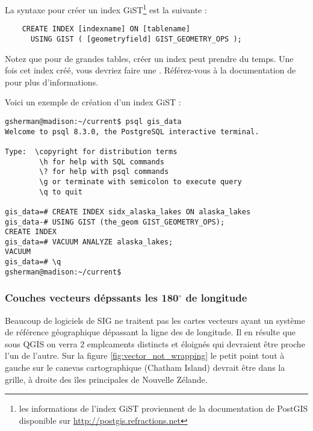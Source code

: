 La syntaxe pour créer un index GiST\footnote{les informations de l'index GiST proviennent de la documentation de PostGIS disponible sur \url{http://postgis.refractions.net}} est la suivante :

\begin{verbatim}
    CREATE INDEX [indexname] ON [tablename]
      USING GIST ( [geometryfield] GIST_GEOMETRY_OPS );
\end{verbatim}

Notez que pour de grandes tables, créer un index peut prendre du temps. Une fois cet index créé, vous devriez faire une . Référez-vous à la documentation de \cite{PostGISweb} pour plus d'informations.

Voici un exemple de création d'un index GiST :
\begin{verbatim}
gsherman@madison:~/current$ psql gis_data
Welcome to psql 8.3.0, the PostgreSQL interactive terminal.

Type:  \copyright for distribution terms
        \h for help with SQL commands
        \? for help with psql commands
        \g or terminate with semicolon to execute query
        \q to quit

gis_data=# CREATE INDEX sidx_alaska_lakes ON alaska_lakes
gis_data-# USING GIST (the_geom GIST_GEOMETRY_OPS);
CREATE INDEX
gis_data=# VACUUM ANALYZE alaska_lakes;
VACUUM
gis_data=# \q
gsherman@madison:~/current$
\end{verbatim}

\subsubsection{Couches vecteurs dépssants les 180$^\circ$ de longitude}

Beaucoup de logiciels de SIG ne traitent pas les cartes vecteurs  ayant un système de référence géographique dépassant la ligne des  de longitude. Il en résulte que sous QGIS on verra 2 emplcaments distincts et éloignés qui devraient être proche l'un de l'autre. Sur la figure \ref{fig:vector_not_wrapping} le petit point tout à gauche sur le canevas cartographique (Chatham Island) devrait être dans la grille, à droite des îles principales de Nouvelle Zélande.


